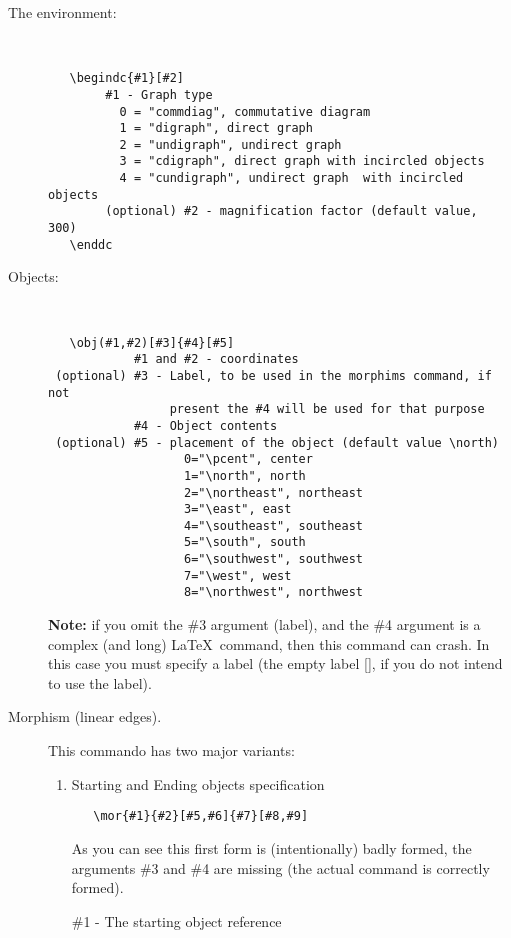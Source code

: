 \documentclass[11pt]{article}
\begin{document}
\begin{description}
\item[The environment:] {\ } 

\begin{verbatim}
   \begindc{#1}[#2]
        #1 - Graph type
          0 = "commdiag", commutative diagram
          1 = "digraph", direct graph
          2 = "undigraph", undirect graph
          3 = "cdigraph", direct graph with incircled objects
          4 = "cundigraph", undirect graph  with incircled objects            
        (optional) #2 - magnification factor (default value, 300)
   \enddc
\end{verbatim}

\item[Objects:] {\ }

\begin{verbatim}
   \obj(#1,#2)[#3]{#4}[#5]
            #1 and #2 - coordinates
 (optional) #3 - Label, to be used in the morphims command, if not
                 present the #4 will be used for that purpose
            #4 - Object contents
 (optional) #5 - placement of the object (default value \north)
                   0="\pcent", center
                   1="\north", north
                   2="\northeast", northeast
                   3="\east", east
                   4="\southeast", southeast
                   5="\south", south
                   6="\southwest", southwest
                   7="\west", west
                   8="\northwest", northwest
\end{verbatim}

  {\bf Note:} if you omit the \#3 argument (label), and the \#4 argument
  is a complex (and long) \LaTeX\ command, then this command can
  crash. In this case you must specify a label (the empty label [], if
  you do not intend to use the label).

\item[Morphism (linear edges).] This commando has two major
  variants:
  \begin{enumerate}
  \item Starting and Ending objects specification
\begin{verbatim}
   \mor{#1}{#2}[#5,#6]{#7}[#8,#9]
\end{verbatim}

    As you can see this first form is (intentionally) badly formed, the
    arguments \#3 and \#4 are missing (the actual command is correctly
    formed). 
 
    \#1 - The starting object reference


\end{enumerate}
\end{description}
\end{document}

